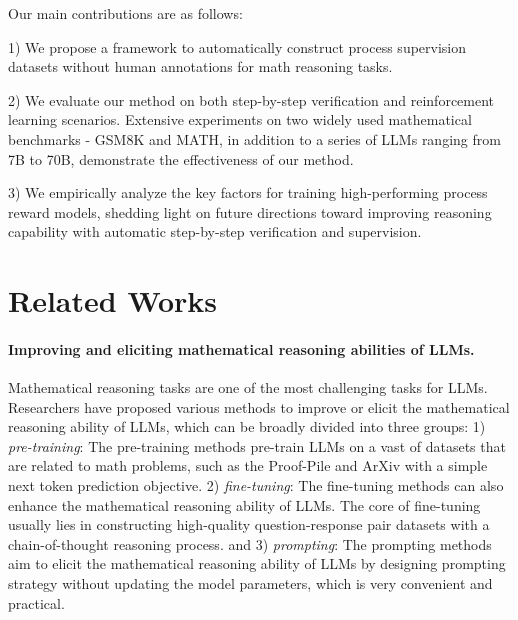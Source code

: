 \documentclass{article} %
\begin{document}
Our main contributions are as follows: 

1) We propose a framework to automatically construct process supervision datasets without human annotations for math reasoning tasks. 

2) We evaluate our method on both step-by-step verification and reinforcement learning scenarios. Extensive experiments on two widely used mathematical benchmarks - GSM8K and MATH, in addition to a series of LLMs ranging from 7B to 70B, demonstrate the effectiveness of our method.

3) We empirically analyze the key factors for training high-performing process reward models, shedding light on future directions toward improving reasoning capability with automatic step-by-step verification and supervision.


\section{Related Works}
\paragraph{Improving and eliciting mathematical reasoning abilities of LLMs.}
Mathematical reasoning tasks are one of the most challenging tasks for LLMs. 
Researchers have proposed various methods to improve or elicit the mathematical reasoning ability of LLMs, which can be broadly divided into three groups:
1) \textit{pre-training}: The pre-training methods \citep{gpt4,palm,LLaMA,azerbayev2023llemma} pre-train LLMs on a vast of datasets that are related to math problems, such as the Proof-Pile and ArXiv \citep{azerbayev2023llemma} with a simple next token prediction objective. 
2) \textit{fine-tuning}: The fine-tuning methods \citep{yu2023metamath,luo2023wizardmath,yue2023mammoth,wang2023making,gou2023tora} can also enhance the mathematical reasoning ability of LLMs. 
The core of fine-tuning usually lies in constructing high-quality question-response pair datasets with a chain-of-thought reasoning process. 
and 3) \textit{prompting}: The prompting methods \citep{cot,zhang2023cumulative,fu2022complexity,bi2023program} aim to elicit the mathematical reasoning ability of LLMs by designing prompting strategy without updating the model parameters, which is very convenient and practical.
\end{document}
